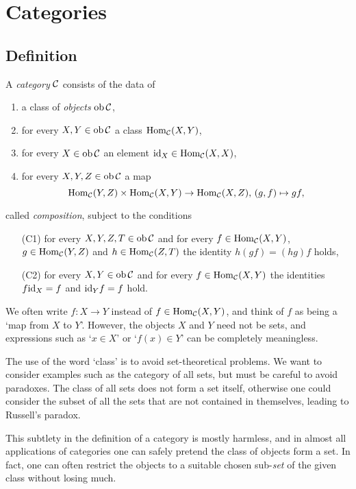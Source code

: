 
\chapter{Categories}
\label{chapter:categories}


\section{Definition}

\begin{definition}A \emph{category} ${\mathcal{C}}$ consists of the data of
\begin{enumerate}
\item a class of \emph{objects} $\operatorname{ob} {\mathcal{C}}$, 
\item for every $X,Y\in \operatorname{ob} {\mathcal{C}}$ a class $\operatorname{Hom}_{\mathcal{C}}(X,Y)$,
\item for every $X\in \operatorname{ob}{\mathcal{C}}$ an element ${\rm id}_X \in \operatorname{Hom}_{\mathcal{C}}(X,X)$,
\item for every $X,Y,Z \in \operatorname{ob} {\mathcal{C}}$ a map
\[
	  \operatorname{Hom}_{\mathcal{C}}(Y,Z) \times \operatorname{Hom}_{\mathcal{C}}(X,Y) \to \operatorname{Hom}_{\mathcal{C}}(X,Z),\,
	(g,f) \mapsto gf,
\]
\end{enumerate}
called \emph{composition}, subject to the conditions
\begin{enumerate}
\item[(C1)] for every $X,Y,Z,T \in \operatorname{ob} {\mathcal{C}}$ and for every $f \in \operatorname{Hom}_{\mathcal{C}}(X,Y)$, $g\in \operatorname{Hom}_{\mathcal{C}}(Y,Z)$ and $h \in \operatorname{Hom}_{\mathcal{C}}(Z,T)$ the identity $h(gf) = (hg)f$ holds,
\item[(C2)] for every $X,Y\in \operatorname{ob} {\mathcal{C}}$ and for every $f\in \operatorname{Hom}_{\mathcal{C}}(X,Y)$ the identities $f {\rm id}_X = f$ and ${\rm id}_Y f = f$ hold.
\end{enumerate}
\end{definition}

We often write $f\colon X\to Y$ instead of $f\in \operatorname{Hom}_{\mathcal{C}}(X,Y)$, and think of $f$ as being a `map from $X$ to $Y$'. However, the objects $X$ and $Y$ need not be sets, and expressions such as `$x\in X$' or `$f(x)\in Y$' can be completely meaningless. 

\begin{remark}
The use of the word `class' is to avoid set-theoretical problems. We want to consider examples such as the category of all sets, but must be careful to avoid paradoxes. The class of all sets does not form a set itself, otherwise one could consider the subset of all the sets that are not contained in themselves, leading to Russell's paradox. 

This subtlety in the definition of a category is mostly harmless, and in almost all applications of categories one can safely pretend the class of objects form a set. In fact, one can often restrict the objects to a suitable chosen sub-\emph{set} of the given class without losing much.
\end{remark}

